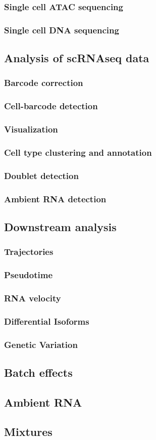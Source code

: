 \subsubsection{Single cell ATAC sequencing}
\subsubsection{Single cell DNA sequencing}

\subsection{Analysis of scRNAseq data}
\subsubsection{Barcode correction}
\subsubsection{Cell-barcode detection}
\subsubsection{Visualization}
\subsubsection{Cell type clustering and annotation}
\subsubsection{Doublet detection}
\subsubsection{Ambient RNA detection}
\subsection{Downstream analysis}
\subsubsection{Trajectories}
\subsubsection{Pseudotime}
\subsubsection{RNA velocity}
\subsubsection{Differential Isoforms}
\subsubsection{Genetic Variation}




\subsection{Batch effects}
\subsection{Ambient RNA}

\subsection{Mixtures}
